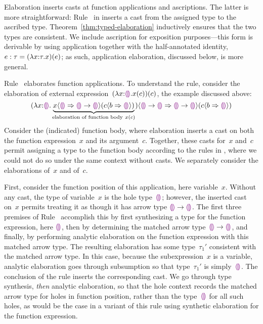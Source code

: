 Elaboration inserts casts at function applications and ascriptions.
%
The latter is more straightforward: Rule~
in  inserts a cast from the assigned type to the
ascribed type.
%
Theorem~\ref{thm:typed-elaboration} inductively ensures that the two types
are consistent.
%
We include ascription for exposition purposes---this form is derivable
by using application together with the half-annotated identity, $e
: \tau = (\lambda x{:}\tau.x)(e)$; as such, application
elaboration, discussed below, is more general.

Rule~ elaborates function applications.
%
To understand the rule, consider the elaboration of external
expression~$(\lambda x{:}\textcolor{violet}{\llparenthesis}\textcolor{violet}{\rrparenthesis}.x(c))(c)$, the example
discussed above:
\[
        \hap{\dcasttwo{
        (\halam{x}{\tehole}{\underbrace{
                \hap{\dcasttwo{x}{\tehole}{\tarr{\tehole}{\tehole}}}
                {\dcasttwo{c}{b}{\tehole}}
                }_{\textrm{elaboration of function body}~x(c)}
        }
        )}{\tarr{\tehole}{\tehole}}{
           \tarr{\tehole}{\tehole}}
           }
           {\dcasttwo{c}{b}{\tehole}}
\]
Consider the (indicated) function body,
%
where elaboration inserts a cast on both the function expression~$x$ and
its argument~$c$.
%
Together, these casts for~$x$ and~$c$ permit assigning a type to the
function body according to the rules in , where we
could not do so under the same context without casts.
%
We separately consider the elaborations of~$x$ and of~$c$.

First, consider the function position of this application, here variable~$x$.
%
Without any cast, the type of variable~$x$ is the hole type~$\textcolor{violet}{\llparenthesis}\textcolor{violet}{\rrparenthesis}$;
however, the inserted cast on~$x$ permits treating it as though it has
arrow type $\textcolor{violet}{\llparenthesis}\textcolor{violet}{\rrparenthesis} \rightarrow \textcolor{violet}{\llparenthesis}\textcolor{violet}{\rrparenthesis}$.
%
The first three premises of Rule~ accomplish this
%
by first synthesizing a type for the function expression, here
$\textcolor{violet}{\llparenthesis}\textcolor{violet}{\rrparenthesis}$, then
%
by determining the matched arrow type~$\textcolor{violet}{\llparenthesis}\textcolor{violet}{\rrparenthesis} \rightarrow \textcolor{violet}{\llparenthesis}\textcolor{violet}{\rrparenthesis}$, and
finally,
%
by performing analytic elaboration on the function expression with this
matched arrow type.
%
The resulting elaboration has some type~$\tau_1'$ consistent with the
matched arrow type.
%
In this case, because the subexpression~$x$ is a variable, analytic
elaboration goes through subsumption so that type~$\tau_1'$ is
simply~$\textcolor{violet}{\llparenthesis}\textcolor{violet}{\rrparenthesis}$.
%
The conclusion of the rule inserts the corresponding cast.
%
We go through type synthesis, \emph{then} analytic elaboration, so that the
hole context records the matched arrow type for holes in function position,
rather than the type~$\textcolor{violet}{\llparenthesis}\textcolor{violet}{\rrparenthesis}$ for all such holes, as would be the case in
a variant of this rule using synthetic elaboration for the function
expression.

